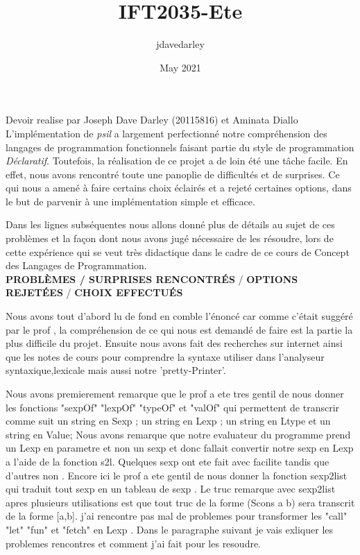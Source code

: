 \documentclass{article}
\title{IFT2035-Ete}
\author{jdavedarley }
\date{May 2021}
\begin{document}
   Devoir realise par Joseph Dave Darley (20115816) et Aminata Diallo\\
   

   L'implémentation de \emph {psil} a largement perfectionné notre compréhension des langages de programmation fonctionnels faisant partie du style de programmation \emph {Déclaratif}. Toutefois, la réalisation de ce projet a de loin été une tâche facile. En effet, nous avons rencontré toute une panoplie de difficultés et de surprises. Ce qui nous a amené à faire certains choix éclairés et a rejeté certaines options, dans le but de parvenir à une implémentation simple et efficace.
   
   \vspace{.7 cm}
   Dans les lignes subséquentes nous allons donné plus de détails au sujet de ces problèmes et la façon dont nous avons jugé nécessaire de les résoudre, lors de cette expérience qui se veut très didactique dans le cadre de ce cours de Concept des Langages de Programmation.\\
   
   \textbf {PROBLÈMES / SURPRISES RENCONTRÉS} / \textbf {OPTIONS REJETÉES} / \textbf {CHOIX EFFECTUÉS} \vspace{.7 cm}

Nous avons tout d'abord lu de fond en comble l'énoncé car comme c'était suggéré par le prof , la compréhension de ce qui nous est demandé de faire est la partie la plus difficile du projet. Ensuite nous avons fait des recherches sur internet ainsi que les notes de cours pour comprendre la syntaxe utiliser dans l'analyseur syntaxique,lexicale mais aussi  notre 'pretty-Printer'. \vspace{.7 cm} 

Nous avons premierement remarque que le prof a ete tres gentil de nous donner les fonctions "sexpOf" "lexpOf" "typeOf" et "valOf" qui permettent de transcrir comme suit un string en Sexp ; un string en Lexp ; un string en Ltype et un string en Value; Nous avons remarque que notre evaluateur du programme prend un Lexp en parametre et non un sexp et donc fallait convertir notre sexp en Lexp a l'aide de la fonction s2l. Quelques sexp ont ete fait avec facilite tandis que d'autres non . Encore ici le prof a ete gentil de nous donner la fonction sexp2list qui traduit tout sexp en un tableau de sexp . Le truc remarque avec sexp2list apres plusieurs utilisations est  que tout truc de la forme (Scons a b) sera transcrit de la forme [a,b]. j'ai rencontre pas mal  de problemes pour transformer les "call" "let" "fun" et "fetch" en Lexp . Dans le paragraphe suivant je vais exliquer les problemes rencontres et comment j'ai fait pour les resoudre. \vspace{.7 cm}
\end{document}
